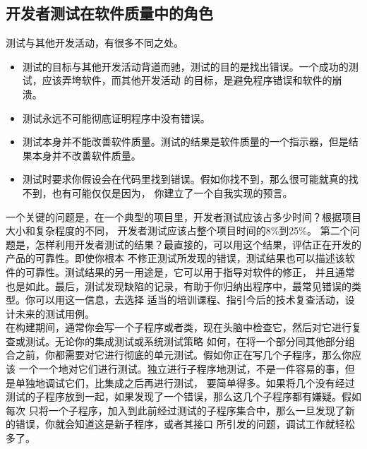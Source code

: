 \documentclass{article}
\begin{document}
\subsection{开发者测试在软件质量中的角色}
测试与其他开发活动，有很多不同之处。
\begin{itemize}
    \item 测试的目标与其他开发活动背道而驰，测试的目的是找出错误。一个成功的测试，应该弄垮软件，而其他开发活动
    的目标，是避免程序错误和软件的崩溃。
    \item 测试永远不可能彻底证明程序中没有错误。
    \item 测试本身并不能改善软件质量。测试的结果是软件质量的一个指示器，但是结果本身并不改善软件质量。
    \item 测试时要求你假设会在代码里找到错误。假如你找不到，那么很可能就真的找不到，也有可能仅仅是因为，
    你建立了一个自我实现的预言。
\end{itemize}

一个关键的问题是，在一个典型的项目里，开发者测试应该占多少时间？根据项目大小和复杂程度的不同，
开发者测试应该占整个项目时间的8\%到25\%。
第二个问题是，怎样利用开发者测试的结果？最直接的，可以用这个结果，评估正在开发的产品的可靠性。即使你根本
不修正测试所发现的错误，测试结果也可以描述该软件的可靠性。测试结果的另一用途是，它可以用于指导对软件的修正，
并且通常也是如此。最后，测试发现缺陷的记录，有助于你归纳出程序中，最常见错误的类型。你可以用这一信息，去选择
适当的培训课程、指引今后的技术复查活动，设计未来的测试用例。\\

在构建期间，通常你会写一个子程序或者类，现在头脑中检查它，然后对它进行复查或测试。无论你的集成测试或系统测试策略
如何，在将一个部分同其他部分组合之前，你都需要对它进行彻底的单元测试。假如你正在写几个子程序，那么你应该
一个一个地对它们进行测试。独立进行子程序地测试，不是一件容易的事，但是单独地调试它们，比集成之后再进行测试，
要简单得多。如果将几个没有经过测试的子程序放到一起，如果发现了一个错误，那么这几个子程序都有嫌疑。假如每次
只将一个子程序，加入到此前经过测试的子程序集合中，那么一旦发现了新的错误，你就会知道这是新子程序，或者其接口
所引发的问题，调试工作就轻松多了。
\end{document}
